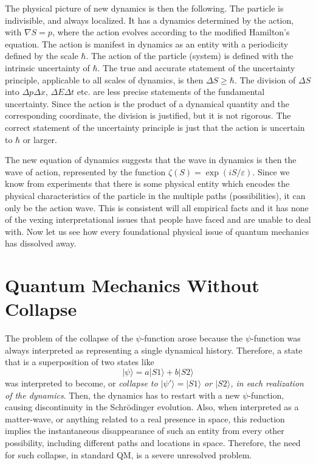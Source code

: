 The physical picture of new dynamics is then the following. The particle is indivisible,
and always localized. It has a dynamics determined by the action, with $\nabla S = p$, where
the action evolves according to the modified Hamilton's equation. The action is manifest in
dynamics as an entity with a periodicity defined by the scale $\hbar$. The action of the particle
(system) is defined with the intrinsic uncertainty of $\hbar$. The true and accurate statement of
the uncertainty principle, applicable to all scales of dynamics, is then $\Delta S  \geq \hbar$. The division
of $\Delta S$ into $\Delta p \Delta x$, $\Delta E \Delta t$ etc. are less precise statements of the fundamental uncertainty.
Since the action is the product of a dynamical quantity and the corresponding coordinate,
the division is justified, but it is not rigorous. The correct statement of the uncertainty
principle is just that the action is uncertain to $\hbar$ or larger.

The new equation of dynamics suggests that the wave in dynamics is then the wave
of action, represented by the function $\zeta (S) = \exp(iS/\varepsilon)$. Since we know from experiments
that there is some physical entity which encodes the physical characteristics of the particle
in the multiple paths (possibilities), it can only be the action wave. This is consistent will
all empirical facts and it has none of the vexing interpretational issues that people have
faced and are unable to deal with. Now let us see how every foundational physical issue of
quantum mechanics has dissolved away.

\section{Quantum Mechanics Without Collapse}%

The problem of the collapse of the $\psi$-function arose because the $\psi$-function was always
interpreted as representing a single dynamical history. Therefore, a state that is a superposition of two states like
\begin{equation*}
|\psi \rangle = a |S1 \rangle + b |S2 \rangle \tag{28}
\end{equation*}
was interpreted to become, or \textit{collapse to $|\psi' \rangle = |S1 \rangle$  or $|S2 \rangle$, in each realization of the
dynamics}. Then, the dynamics has to restart with a new $\psi$-function, causing discontinuity
in the Schr\"{o}dinger evolution. Also, when interpreted as a matter-wave, or anything related to a real presence in space, this reduction implies the instantaneous disappearance of such an entity from every other possibility, including different paths and locations in space. 
Therefore, the need for such collapse, in standard QM, is a severe unresolved problem.


